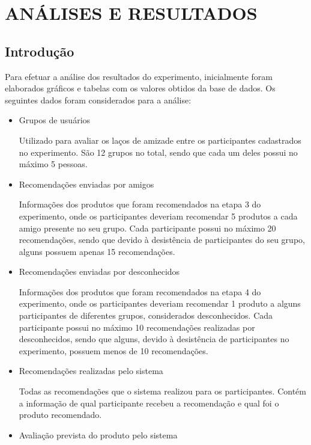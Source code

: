 \chapter{ANÁLISES E RESULTADOS} %
\label{cha:analises_e_resultados}

\section{Introdução}
\label{cha:introducao}

 Para efetuar a análise dos resultados do experimento, inicialmente foram elaborados gráficos e tabelas com os valores obtidos da base de dados. Os seguintes dados foram considerados para a análise:
 
\begin{itemize}
	\item Grupos de usuários
	
	\subitem Utilizado para avaliar os laços de amizade entre os participantes cadastrados no experimento. São 12 grupos no total, sendo que cada um deles possui no máximo 5 pessoas.
	
	\item Recomendações enviadas por amigos
	
	\subitem Informações dos produtos que foram recomendados na etapa 3 do experimento, onde os participantes deveriam recomendar 5 produtos a cada amigo presente no seu grupo. Cada participante possui no máximo 20 recomendações, sendo que devido à desistência de participantes do seu grupo, alguns possuem apenas 15 recomendações.
	
	\item Recomendações enviadas por desconhecidos
	
	\subitem Informações dos produtos que foram recomendados na etapa 4 do experimento, onde os participantes deveriam recomendar 1 produto a alguns participantes de diferentes grupos, considerados desconhecidos. Cada participante possui no máximo 10 recomendações realizadas por desconhecidos, sendo que alguns, devido à desistência de participantes no experimento, possuem menos de 10 recomendações.
	
	\item Recomendações realizadas pelo sistema
	
	\subitem Todas as recomendações que o sistema realizou para os participantes. Contém a informação de qual participante recebeu a recomendação e qual foi o produto recomendado.
	
	\item Avaliação prevista do produto pelo sistema
	

\end{itemize}

